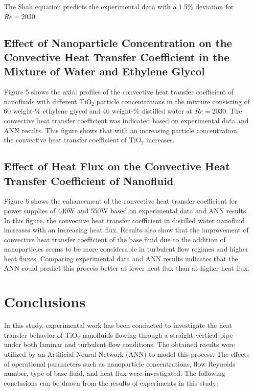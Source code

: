 \documentclass{article}
\begin{document}
The Shah equation predicts the experimental data with a 1.5\% deviation for $Re = 2030$.

\subsection{Effect of Nanoparticle Concentration on the Convective Heat Transfer Coefficient in the Mixture of Water and Ethylene Glycol}

Figure 5 shows the axial profiles of the convective heat transfer coefficient of nanofluids with different TiO$_2$ particle concentrations in the mixture consisting of 60 weight-\% ethylene glycol and 40 weight-\% distilled water at $Re = 2030$. The convective heat transfer coefficient was indicated based on experimental data and ANN results. This figure shows that with an increasing particle concentration, the convective heat transfer coefficient of TiO$_2$ increases.

\subsection{Effect of Heat Flux on the Convective Heat Transfer Coefficient of Nanofluid}

Figure 6 shows the enhancement of the convective heat transfer coefficient for power supplies of 440W and 550W based on experimental data and ANN results. In this figure, the convective heat transfer coefficient in distilled water nanofluid increases with an increasing heat flux. Results also show that the improvement of convective heat transfer coefficient of the base fluid due to the addition of nanoparticles seems to be more considerable in turbulent flow regimes and higher heat fluxes. Comparing experimental data and ANN results indicates that the ANN could predict this process better at lower heat flux than at higher heat flux.

\section{Conclusions}

In this study, experimental work has been conducted to investigate the heat transfer behavior of TiO$_2$ nanofluids flowing through a straight vertical pipe under both laminar and turbulent flow conditions. The obtained results were utilized by an Artificial Neural Network (ANN) to model this process. The effects of operational parameters such as nanoparticle concentrations, flow Reynolds number, type of base fluid, and heat flux were investigated. The following conclusions can be drawn from the results of experiments in this study:
\end{document}
